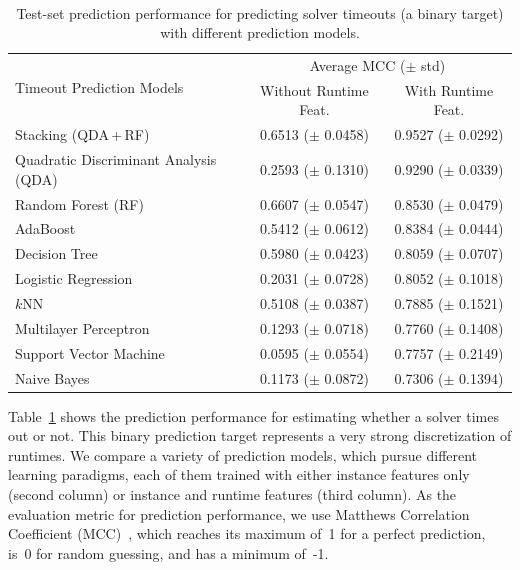 \documentclass[sn-basic, Numbered]{sn-jnl} %
\begin{document}
\begin{table}[tb]
	\centering
	\caption{Test-set prediction performance for predicting solver timeouts (a binary target) with different prediction models.}
	\label{tab:timeout-prediction}
	~\\[1em]
	\begin{tabular}{lcc}
		\toprule
		\multirow[c]{2}{*}{Timeout Prediction Models} & \multicolumn{2}{c}{Average MCC ($\pm$ std)} \\
		\cmidrule(lr){2-3}
		& {Without Runtime Feat.} & {With Runtime Feat.} \\
		\midrule
		Stacking (QDA\,+\,RF)                 & 0.6513 ($\pm$ 0.0458) & 0.9527 ($\pm$ 0.0292) \\[0.4ex]
		Quadratic Discriminant Analysis (QDA)                    & 0.2593 ($\pm$ 0.1310) & 0.9290 ($\pm$ 0.0339) \\[0.4ex]
		Random Forest (RF)         & 0.6607 ($\pm$ 0.0547) & 0.8530 ($\pm$ 0.0479) \\[0.4ex]
		AdaBoost                             & 0.5412 ($\pm$ 0.0612) & 0.8384 ($\pm$ 0.0444) \\[0.4ex]
		Decision Tree                         & 0.5980 ($\pm$ 0.0423) & 0.8059 ($\pm$ 0.0707) \\[0.4ex]
		Logistic Regression                   & 0.2031 ($\pm$ 0.0728) & 0.8052 ($\pm$ 0.1018) \\[0.4ex]
		$k$NN                   & 0.5108 ($\pm$ 0.0387) & 0.7885 ($\pm$ 0.1521) \\[0.4ex]
		Multilayer Perceptron                      & 0.1293 ($\pm$ 0.0718) & 0.7760 ($\pm$ 0.1408) \\[0.4ex]
		Support Vector Machine               & 0.0595 ($\pm$ 0.0554) & 0.7757 ($\pm$ 0.2149) \\[0.4ex]
		Naive Bayes                           & 0.1173 ($\pm$ 0.0872) & 0.7306 ($\pm$ 0.1394) \\
		\bottomrule
	\end{tabular}
\end{table}

Table~\ref{tab:timeout-prediction} shows the prediction performance for estimating whether a solver times out or not.
This binary prediction target represents a very strong discretization of runtimes.
We compare a variety of prediction models, which pursue different learning paradigms, each of them trained with either instance features only (second column) or instance and runtime features (third column).
As the evaluation metric for prediction performance, we use Matthews Correlation Coefficient (MCC)~\cite{gorodkin2004comparing, matthews1975comparison}, which reaches its maximum of~1 for a perfect prediction, is~0 for random guessing, and has a minimum of~-1.
\end{document}
